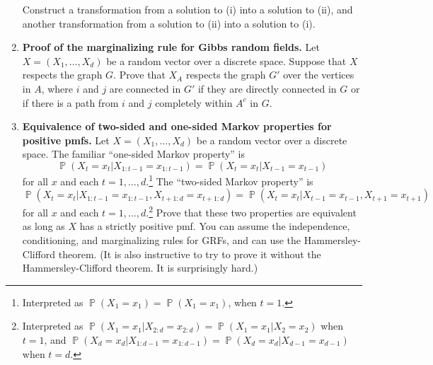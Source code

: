 \documentclass[11pt]{report}
\DeclareMathOperator{\Prob}{\mathbb{P}}
\begin{document}
\begin{enumerate}[1.]
\begin{enumerate}[(i)]
	      \end{enumerate}

	      Construct a transformation from a solution to (i) into a solution to (ii), and another transformation from a solution to (ii) into a solution to (i).


	      \pagebreak


	\item {\bf Proof of the marginalizing rule for Gibbs random fields.} Let $X=(X_1,\dotsc,X_d)$ be a random vector over a discrete space.  Suppose that $X$ respects the graph $G$.  Prove that $X_A$ respects the graph $G'$ over the vertices in $A$, where $i$ and $j$ are connected in $G'$ if they are directly connected in $G$ or if there is a path from $i$ and $j$ completely within $A^c$ in $G$.


	      \pagebreak


	\item {\bf Equivalence of two-sided and one-sided Markov properties for positive pmfs.} Let $X=(X_1,\dotsc,X_d)$ be a random vector over a discrete space. The familiar ``one-sided Markov property'' is
	      \[ \Prob(X_t=x_t|X_{1:t-1}=x_{1:t-1}) = \Prob(X_t=x_t|X_{t-1}=x_{t-1}) \]
	      for all $x$ and each $t=1,\dotsc,d$.\footnote{Interpreted as  $\Prob(X_1=x_1)=\Prob(X_1=x_1)$, when $t=1$.} The ``two-sided Markov property'' is
	      \[ \Prob(X_t=x_t|X_{1:t-1}=x_{1:t-1},X_{t+1:d}=x_{t+1:d}) = \Prob(X_t=x_t|X_{t-1}=x_{t-1},X_{t+1}=x_{t+1}) \]
	      for all $x$ and each $t=1,\dotsc,d$.\footnote{Interpreted as $\Prob(X_1=x_1|X_{2:d}=x_{2:d}) = \Prob(X_1=x_1|X_2=x_2)$ when $t=1$, and $\Prob(X_d=x_d|X_{1:d-1}=x_{1:d-1}) = \Prob(X_d=x_d|X_{d-1}=x_{d-1})$ when $t=d$.} Prove that these two properties are equivalent as long as $X$ has a strictly positive pmf. You can assume the independence, conditioning, and marginalizing rules for GRFs, and can use the Hammersley-Clifford theorem. (It is also instructive to try to prove it without the Hammersley-Clifford theorem. It is surprisingly hard.)



\end{enumerate}
\end{document}
